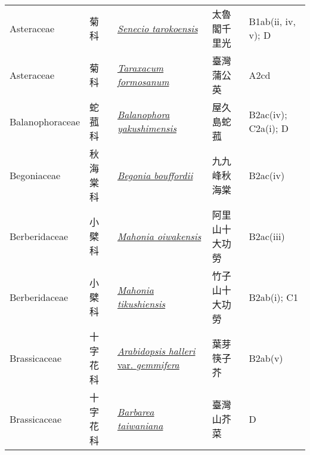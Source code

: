 {\begin{longtable}{L{2.5cm}L{2cm}L{5cm}L{2.5cm}L{3cm}}
    Asteraceae & 菊科 & \href{http://www.theplantlist.org/tpl1.1/search?q=Senecio+tarokoensis}{\textit{Senecio tarokoensis} } & 太魯閣千里光 & B1ab(ii, iv, v); D    \\
    Asteraceae & 菊科 & \href{http://www.theplantlist.org/tpl1.1/search?q=Taraxacum+formosanum}{\textit{Taraxacum formosanum} } & 臺灣蒲公英 & A2cd    \\
    Balanophoraceae & 蛇菰科 & \href{http://www.theplantlist.org/tpl1.1/search?q=Balanophora+yakushimensis}{\textit{Balanophora yakushimensis} } & 屋久島蛇菰 & B2ac(iv); C2a(i); D    \\
    Begoniaceae & 秋海棠科 & \href{http://www.theplantlist.org/tpl1.1/search?q=Begonia+bouffordii}{\textit{Begonia bouffordii} } & 九九峰秋海棠 & B2ac(iv)    \\
    Berberidaceae & 小檗科 & \href{http://www.theplantlist.org/tpl1.1/search?q=Mahonia+oiwakensis}{\textit{Mahonia oiwakensis} } & 阿里山十大功勞 & B2ac(iii)    \\
    Berberidaceae & 小檗科 & \href{http://www.theplantlist.org/tpl1.1/search?q=Mahonia+tikushiensis}{\textit{Mahonia tikushiensis} } & 竹子山十大功勞 & B2ab(i); C1    \\
    Brassicaceae & 十字花科 & \href{http://www.theplantlist.org/tpl1.1/search?q=Arabidopsis+halleri+var.+gemmifera}{\textit{Arabidopsis halleri} var. \textit{gemmifera} } & 葉芽筷子芥 & B2ab(v)    \\
    Brassicaceae & 十字花科 & \href{http://www.theplantlist.org/tpl1.1/search?q=Barbarea+taiwaniana}{\textit{Barbarea taiwaniana} } & 臺灣山芥菜 & D    \\

\end{longtable}}
